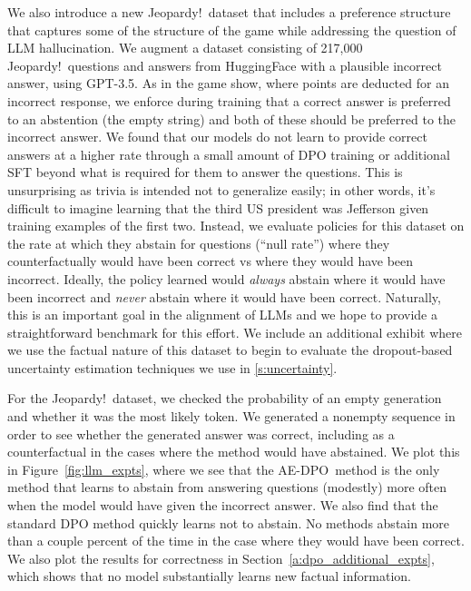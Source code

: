\documentclass{article} \usepackage{iclr2023_conference,times}
\newcommand{\dpoae}{AE-DPO}
\newcommand{\add}[1]{#1}
\begin{document}
We also introduce a new Jeopardy!\ dataset that includes a preference structure that captures some of the structure of the game while addressing the question of LLM hallucination.
We augment a dataset consisting of 217,000 Jeopardy!\ questions and answers from HuggingFace \citep{jeopardy_huggingface} with a plausible incorrect answer, using GPT-3.5.
As in the game show, where points are deducted for an incorrect response, we enforce during training that a correct answer is preferred to an abstention (the empty string) and both of these should be preferred to the incorrect answer.
We found that our models do not learn to provide correct answers at a higher rate through a small amount of DPO training or additional SFT beyond what is required for them to answer the questions. This is unsurprising as trivia is intended not to generalize easily; in other words, it's difficult to imagine learning that the third US president was Jefferson given training examples of the first two.
Instead, we evaluate policies for this dataset on the rate at which they abstain for questions (``null rate'') where they counterfactually would have been correct vs where they would have been incorrect.
Ideally, the policy learned would \emph{always} abstain where it would have been incorrect and \emph{never} abstain where it would have been correct.
Naturally, this is an important goal in the alignment of LLMs and we hope to provide a straightforward benchmark for this effort.
\add{We include an additional exhibit where we use the factual nature of this dataset to begin to evaluate the dropout-based uncertainty estimation techniques we use in \cref{s:uncertainty}.}

For the Jeopardy!\ dataset, we checked the probability of an empty generation and whether it was the most likely token.
We generated a nonempty sequence in order to see whether the generated answer was correct, including as a counterfactual in the cases where the method would have abstained.
We plot this in Figure~\ref{fig:llm_expts}, where we see that the \dpoae\ method is the only method that learns to abstain from answering questions (modestly) more often when the model would have given the incorrect answer. We also find that the standard DPO method quickly learns not to abstain. No methods abstain more than a couple percent of the time in the case where they would have been correct. We also plot the results for correctness in Section~\ref{a:dpo_additional_expts}, which shows that no model substantially learns new factual information.
 \vspace{-4mm}
\end{document}
